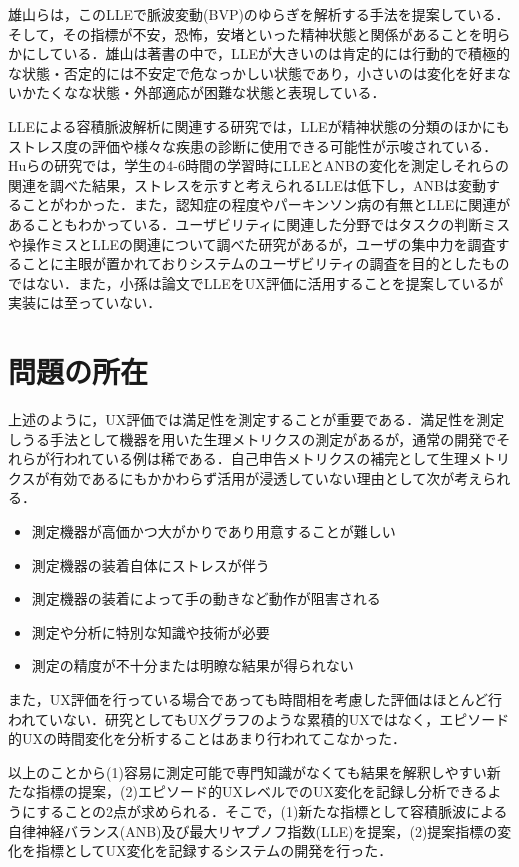雄山らは，このLLEで脈波変動(BVP)のゆらぎを解析する手法を提案している\cite{oyama2006}．そして，その指標が不安，恐怖，安堵といった精神状態と関係があることを明らかにしている\cite{imanishi2007}．雄山は著書の中で，LLEが大きいのは肯定的には行動的で積極的な状態・否定的には不安定で危なっかしい状態であり，小さいのは変化を好まないかたくなな状態・外部適応が困難な状態と表現している\cite{oyama2012book}．

LLEによる容積脈波解析に関連する研究では，LLEが精神状態の分類のほかにもストレス度の評価や様々な疾患の診断に使用できる可能性が示唆されている．Huらの研究では，学生の4-6時間の学習時にLLEとANBの変化を測定しそれらの関連を調べた結果，ストレスを示すと考えられるLLEは低下し，ANBは変動することがわかった\cite{hu}．また，認知症の程度やパーキンソン病の有無とLLEに関連があることもわかっている\cite{oyama2006dimentia}\cite{oyama2018perkinson}．ユーザビリティに関連した分野ではタスクの判断ミスや操作ミスとLLEの関連について調べた研究\cite{imanishi2006}があるが，ユーザの集中力を調査することに主眼が置かれておりシステムのユーザビリティの調査を目的としたものではない．また，小孫は論文でLLEをUX評価に活用することを提案しているが実装には至っていない\cite{komago}．

\section{問題の所在}

上述のように，UX評価では満足性を測定することが重要である．満足性を測定しうる手法として機器を用いた生理メトリクスの測定があるが，通常の開発でそれらが行われている例は稀である．自己申告メトリクスの補完として生理メトリクスが有効であるにもかかわらず活用が浸透していない理由として次が考えられる．

\begin{itemize}
  \item 測定機器が高価かつ大がかりであり用意することが難しい
  \item 測定機器の装着自体にストレスが伴う
  \item 測定機器の装着によって手の動きなど動作が阻害される
  \item 測定や分析に特別な知識や技術が必要
  \item 測定の精度が不十分または明瞭な結果が得られない
\end{itemize}

また，UX評価を行っている場合であっても時間相を考慮した評価はほとんど行われていない．研究としてもUXグラフ\cite{kurosu2015}のような累積的UXではなく，エピソード的UXの時間変化を分析することはあまり行われてこなかった．

以上のことから(1)容易に測定可能で専門知識がなくても結果を解釈しやすい新たな指標の提案，(2)エピソード的UXレベルでのUX変化を記録し分析できるようにすることの2点が求められる．そこで，(1)新たな指標として容積脈波による自律神経バランス(ANB)及び最大リヤプノフ指数(LLE)を提案，(2)提案指標の変化を指標としてUX変化を記録するシステムの開発を行った．